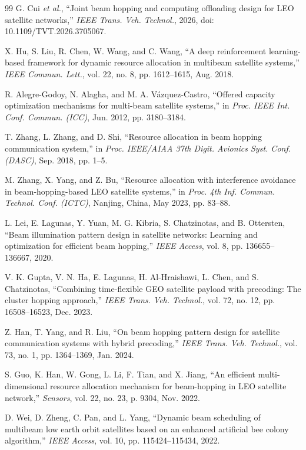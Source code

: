 \documentclass[journal]{IEEEtran}
\newcommand{\revbegin}[1]{\color{revisionblue}\ignorespaces}
\newcommand{\revend}[1]{\color{black}\ignorespaces}
\begin{document}
\begin{thebibliography}{99}
\revbegin{} G. Cui \textit{et al.}, ``Joint beam hopping and computing offloading design for LEO satellite networks,'' \textit{IEEE Trans. Veh. Technol.}, 2026, doi: 10.1109/TVT.2026.3705067.\revend{}

 X. Hu, S. Liu, R. Chen, W. Wang, and C. Wang, ``A deep reinforcement learning-based framework for dynamic resource allocation in multibeam satellite systems,'' \textit{IEEE Commun. Lett.}, vol. 22, no. 8, pp. 1612--1615, Aug. 2018.

 R. Alegre-Godoy, N. Alagha, and M. A. V\'azquez-Castro, ``Offered capacity optimization mechanisms for multi-beam satellite systems,'' in \textit{Proc. IEEE Int. Conf. Commun. (ICC)}, Jun. 2012, pp. 3180--3184.

 T. Zhang, L. Zhang, and D. Shi, ``Resource allocation in beam hopping communication system,'' in \textit{Proc. IEEE/AIAA 37th Digit. Avionics Syst. Conf. (DASC)}, Sep. 2018, pp. 1--5.

 M. Zhang, X. Yang, and Z. Bu, ``Resource allocation with interference avoidance in beam-hopping-based LEO satellite systems,'' in \textit{Proc. 4th Inf. Commun. Technol. Conf. (ICTC)}, Nanjing, China, May 2023, pp. 83--88.

 L. Lei, E. Lagunas, Y. Yuan, M. G. Kibria, S. Chatzinotas, and B. Ottersten, ``Beam illumination pattern design in satellite networks: Learning and optimization for efficient beam hopping,'' \textit{IEEE Access}, vol. 8, pp. 136655--136667, 2020.

 V. K. Gupta, V. N. Ha, E. Lagunas, H. Al-Hraishawi, L. Chen, and S. Chatzinotas, ``Combining time-flexible GEO satellite payload with precoding: The cluster hopping approach,'' \textit{IEEE Trans. Veh. Technol.}, vol. 72, no. 12, pp. 16508--16523, Dec. 2023.

 Z. Han, T. Yang, and R. Liu, ``On beam hopping pattern design for satellite communication systems with hybrid precoding,'' \textit{IEEE Trans. Veh. Technol.}, vol. 73, no. 1, pp. 1364--1369, Jan. 2024.

 S. Guo, K. Han, W. Gong, L. Li, F. Tian, and X. Jiang, ``An efficient multi-dimensional resource allocation mechanism for beam-hopping in LEO satellite network,'' \textit{Sensors}, vol. 22, no. 23, p. 9304, Nov. 2022.

 D. Wei, D. Zheng, C. Pan, and L. Yang, ``Dynamic beam scheduling of multibeam low earth orbit satellites based on an enhanced artificial bee colony algorithm,'' \textit{IEEE Access}, vol. 10, pp. 115424--115434, 2022.


\end{thebibliography}
\end{document}
